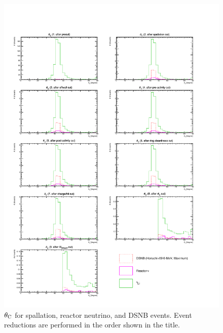 \begin{figure}[h]
	\centering
	\includegraphics[width=15cm]{PDF/Dist_Nuebar/Che_50deg_tag_ge1/angle}
	\caption[$\theta_{\rm C}$ for spallation, reactor neutrino, and DSNB events]{
	$\theta_{\rm C}$ for spallation, reactor neutrino, and DSNB events.
	Event reductions are performed in the order shown in the title.
	}\label{Nuebar_angle}
\end{figure}


